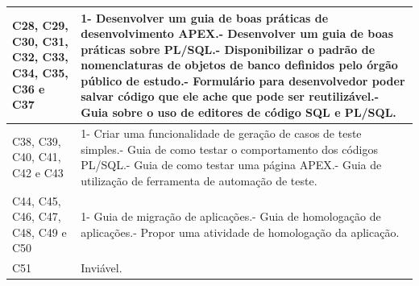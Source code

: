 \begin{longtable}{|M{2.0cm}|m{13.0cm}|}
C28, C29, C30, C31, C32, C33, C34, C35, C36 e C37 & 1- Desenvolver um guia de boas práticas de desenvolvimento APEX.- Desenvolver um guia de boas práticas sobre PL/SQL.- Disponibilizar o padrão de nomenclaturas de objetos de banco definidos pelo órgão público de estudo.- Formulário para desenvolvedor poder salvar código que ele ache que pode ser reutilizável.- Guia sobre o uso de editores de código SQL e PL/SQL.                                                                                                                                       \\ \hline
C38, C39, C40, C41, C42 e C43                   & 1- Criar uma funcionalidade de geração de casos de teste simples.- Guia de como testar o comportamento dos códigos PL/SQL.- Guia de como testar uma página APEX.- Guia de utilização de ferramenta de automação de teste.                                                                                                                                                                                                                                                                               \\ \hline
C44, C45, C46, C47, C48, C49 e C50                & 1- Guia de migração de aplicações.- Guia de homologação de aplicações.- Propor uma atividade de homologação da aplicação.                                                                                                                                                                                                                                                                                                                                                                                   \\ \hline
C51                                              & Inviável.                                                                                                                                                                                                                                                                                                                                                                                                                                                                                                                                                      \\ \hline
\end{longtable}

